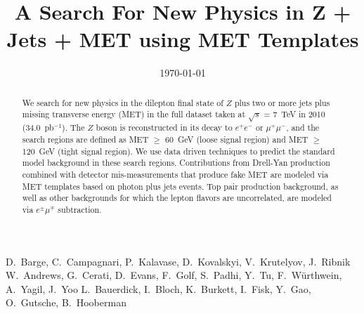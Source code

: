 \documentclass{cmspaper}
\newcommand{\Z}{$Z$ } %
\newcommand{\lumi}{34.0~pb$^{-1}$}
\begin{document}
\begin{titlepage}


  \date{\today}
 
  \title{A Search For New Physics in Z + Jets + MET using MET Templates}

  \begin{Authlist}
      D.~Barge, C.~Campagnari, P.~Kalavase, D.~Kovalskyi, V.~Krutelyov, J.~Ribnik
    W.~Andrews, G.~Cerati, D.~Evans, F.~Golf, S.~Padhi, Y.~Tu, F.~W\"urthwein, A.~Yagil, J.~Yoo
    L.~Bauerdick, I.~Bloch, K.~Burkett, I.~Fisk, Y.~Gao, O.~Gutsche, B.~Hooberman
  \end{Authlist}

  \begin{abstract}

We search for new physics in the dilepton final state of \Z plus two or more jets plus missing transverse 
energy (MET) in the full dataset taken at $\sqrt{s}$ = 7~TeV in 2010 (\lumi). 
The \Z boson is reconstructed in its decay to $e^+e^-$ or $\mu^+\mu^-$, and
the search regions are defined as MET $\ge$ 60~GeV (loose signal region) and MET $\ge$ 120~GeV (tight signal region). 
We use data driven techniques to predict the standard model background in these
search regions. 
Contributions from Drell-Yan production combined with detector mis-measurements that produce fake MET are modeled via MET templates based on photon plus jets events. 
Top pair production background, as well as other backgrounds for which the lepton
flavors are uncorrelated, are modeled via $e^\pm\mu^\mp$ subtraction.


  \end{abstract}
\end{titlepage}


\setcounter{page}{2}%
\newpage
\tableofcontents
\newpage
\linenumbers


%














\clearpage


\clearpage
\appendix

%

\end{document}
